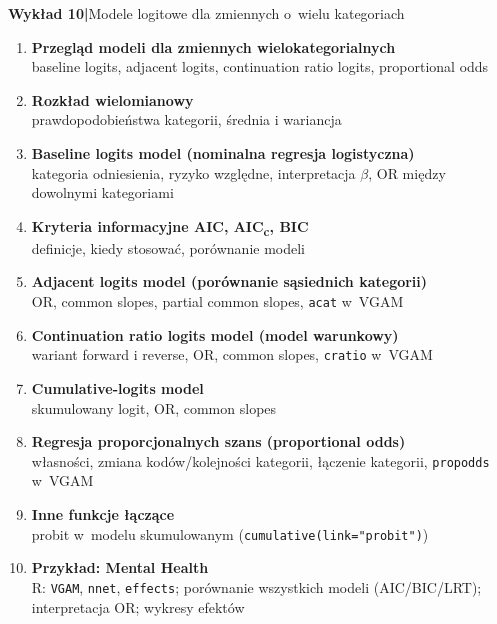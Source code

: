 \documentclass[a4paper,11pt]{article}
\begin{document}
\vspace{1em}

\begin{mdframed}[
  backgroundcolor=lightblue,
  linecolor=borderblue,
  linewidth=0.8pt,
  innerleftmargin=10pt,
  innerrightmargin=10pt,
  innertopmargin=6pt,
  innerbottommargin=6pt,
  roundcorner=4pt
]
  \textbf{\color{accentblue}Wykład 10\quad|\quad}{\color{darkgray}Modele logitowe dla zmiennych o~wielu kategoriach}
\end{mdframed}

\vspace{0.4em}
\begin{enumerate}[label=\textbf{\arabic*.}, leftmargin=1.8em, itemsep=3pt, topsep=2pt]
  \item \textbf{Przegląd modeli dla zmiennych wielokategorialnych}\\
        {\small\color{medgray}baseline logits, adjacent logits, continuation ratio logits, proportional odds}
  \item \textbf{Rozkład wielomianowy}\\
        {\small\color{medgray}prawdopodobieństwa kategorii, średnia i wariancja}
  \item \textbf{Baseline logits model (nominalna regresja logistyczna)}\\
        {\small\color{medgray}kategoria odniesienia, ryzyko względne, interpretacja $\beta$, OR między dowolnymi kategoriami}
  \item \textbf{Kryteria informacyjne AIC, AIC\textsubscript{c}, BIC}\\
        {\small\color{medgray}definicje, kiedy stosować, porównanie modeli}
  \item \textbf{Adjacent logits model (porównanie sąsiednich kategorii)}\\
        {\small\color{medgray}OR, common slopes, partial common slopes, \texttt{acat} w~VGAM}
  \item \textbf{Continuation ratio logits model (model warunkowy)}\\
        {\small\color{medgray}wariant forward i reverse, OR, common slopes, \texttt{cratio} w~VGAM}
  \item \textbf{Cumulative-logits model}\\
        {\small\color{medgray}skumulowany logit, OR, common slopes}
  \item \textbf{Regresja proporcjonalnych szans (proportional odds)}\\
        {\small\color{medgray}własności, zmiana kodów/kolejności kategorii, łączenie kategorii, \texttt{propodds} w~VGAM}
  \item \textbf{Inne funkcje łączące}\\
        {\small\color{medgray}probit w~modelu skumulowanym (\texttt{cumulative(link="probit")})}
  \item \textbf{Przykład: Mental Health}\\
        {\small\color{medgray}R: \texttt{VGAM}, \texttt{nnet}, \texttt{effects}; porównanie wszystkich modeli (AIC/BIC/LRT); interpretacja OR; wykresy efektów}
\end{enumerate}
\end{document}
